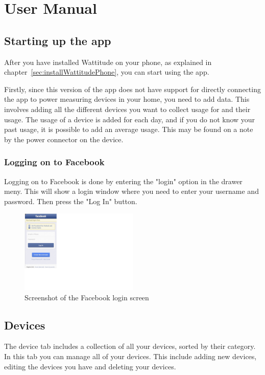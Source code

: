 \chapter{User Manual}
\label{sec:userManual}
\section{Starting up the app}
After you have installed Wattitude on your phone, as explained in chapter~\ref{sec:installWattitudePhone}, you can start using the app. 

Firstly, since this version of the app does not have support for directly connecting the app to power measuring devices in your home, you need to add data. This involves adding all the different devices you want to collect usage for and their usage. The usage of a device is added for each day, and if you do not know your past usage, it is possible to add an average usage. This may be found on a note by the power connector on the device.

\subsection{Logging on to Facebook}
Logging on to Facebook is done by entering the "login" option in the drawer meny. This will show a login window where you need to enter your username and password. Then press the "Log In" button. 

\begin{figure}[H]
\centering
\includegraphics[width=0.5\textwidth, clip, trim=0cm 5.5cm 20.5cm 0cm]{appendix/usermanual/fig/Facebooklogin.png}
\caption{Screenshot of the Facebook login screen}
\end{figure}


\label{sec:devices}
\section{Devices}
The device tab includes a collection of all your devices, sorted by their category. In this tab you can manage all of your devices. This include adding new devices, editing the devices you have and deleting your devices. 

